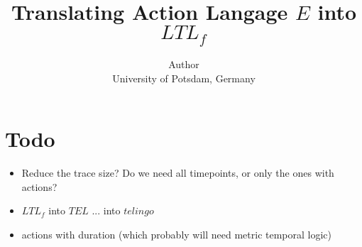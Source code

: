 \documentclass[a4paper]{article}
\begin{document}
\title{Translating Action Langage $E$ into $LTL_f$}

\author{%
  Author\\
  University of Potsdam, Germany
}

\maketitle



%
%
%
%
%

\section{Todo}

\begin{itemize}
  \item Reduce the trace size? Do we need all timepoints, or only the ones with actions?
  \item $LTL_f$ into $TEL$ ... into $telingo$
  \item actions with duration (which probably will need metric temporal logic)
\end{itemize}

\printbibliography{}
\end{document}

